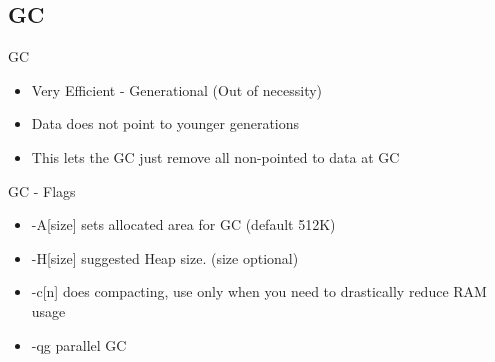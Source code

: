 \subsection{GC}
\begin{frame}[t]{GC}
    \begin{itemize}[<+->]
        \item Very Efficient - Generational (Out of necessity)
        \item Data does not point to younger generations
        \item This lets the GC just remove all non-pointed to data at GC
    \end{itemize}

\end{frame}

\begin{frame}[t]{GC - Flags}
    \begin{itemize}[<+->]
        \item \alert{-A[size]} sets allocated area for GC (default 512K)
        \item \alert{-H[size]} suggested Heap size. (size optional)
        \item \alert{-c[n]} does compacting, use only when you need to drastically reduce RAM usage
        \item \alert{-qg} parallel GC
    \end{itemize}

\end{frame}

